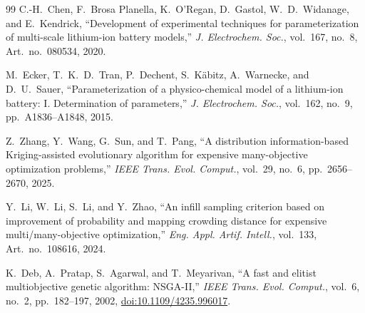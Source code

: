 \documentclass[journal,10pt]{IEEEtran}
\begin{document}
\begin{thebibliography}{99}
C.-H.~Chen, F.~Brosa Planella, K.~O'Regan, D.~Gastol,
W.~D.~Widanage, and E.~Kendrick,
``Development of experimental techniques for parameterization
of multi-scale lithium-ion battery models,''
\textit{J. Electrochem. Soc.},
vol.~167, no.~8, Art.~no.~080534, 2020.

M.~Ecker, T.~K.~D.~Tran, P.~Dechent,
S.~K\"abitz, A.~Warnecke, and D.~U.~Sauer,
``Parameterization of a physico-chemical model of a lithium-ion
battery: I. Determination of parameters,''
\textit{J. Electrochem. Soc.},
vol.~162, no.~9, pp.~A1836--A1848, 2015.

Z.~Zhang, Y.~Wang, G.~Sun, and T.~Pang,
``A distribution information-based Kriging-assisted evolutionary
algorithm for expensive many-objective optimization problems,''
\textit{IEEE Trans. Evol. Comput.},
vol.~29, no.~6, pp.~2656--2670, 2025.

Y.~Li, W.~Li, S.~Li, and Y.~Zhao,
``An infill sampling criterion based on improvement of probability
and mapping crowding distance for expensive multi/many-objective
optimization,''
\textit{Eng. Appl. Artif. Intell.},
vol.~133, Art.~no.~108616, 2024.

K.~Deb, A.~Pratap, S.~Agarwal, and T.~Meyarivan,
``A fast and elitist multiobjective genetic algorithm: NSGA-II,''
\textit{IEEE Trans. Evol. Comput.},
vol.~6, no.~2, pp.~182--197, 2002,
\href{https://doi.org/10.1109/4235.996017}
{doi:10.1109/4235.996017}.

\end{thebibliography}
\end{document}
